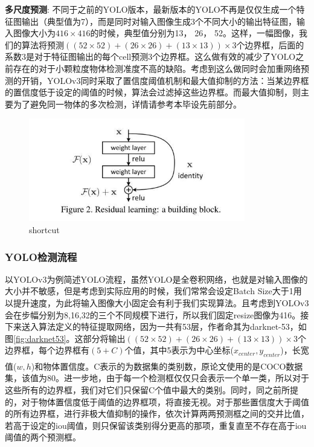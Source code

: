 \documentclass[12pt,a4paper,titlepage]{article}
\newcommand{\upcite}[1]{\textsuperscript{\textsuperscript{\cite{#1}}}}  %
\begin{document}
\textbf{多尺度预测}: 不同于之前的YOLO版本，最新版本的YOLO不再是仅仅生成一个特征图输出（典型值为7），而是同时对输入图像生成3个不同大小的输出特征图，输入图像大小为$416\times 416$的时候，典型值分别为13， 26， 52。这样，一幅图像，我们的算法将预测$((52\times 52)+(26\times 26)+(13\times 13))\times 3$个边界框，后面的系数3是对于特征图输出的每个cell预测3个边界框。这么做有效的减少了YOLO之前存在的对于小颗粒度物体检测准度不高的缺陷。考虑到这么做同时会加重网络预测的开销，YOLOv3同时采取了置信度阈值机制和最大值抑制的方法：当某边界框的置信度低于设定的阈值的时候，算法会过滤掉这些边界框。而最大值抑制，则主要为了避免同一物体的多次检测，详情请参考本毕设先前部分。

\begin{figure}[h]
\centering
\includegraphics[height=4.5cm]{img/shortcut.jpg}
\caption{shortcut}
\label{fig:shortcut}
\end{figure}

\subsubsection{YOLO检测流程}
以YOLOv3为例简述YOLO流程，虽然YOLO是全卷积网络，也就是对输入图像的大小并不敏感，但是考虑到实际应用的时候，我们常常会设定Batch Size大于1用以提升速度，为此将输入图像大小固定会有利于我们实现算法。且考虑到YOLOv3会在步幅分别为8,16,32的三个不同规模下进行，所以我们固定resize图像为416。接下来送入算法定义的特征提取网络，因为一共有53层，作者命其为darknet-53，如图\ref{fig:darknet53}。这部分将输出$((52\times 52)+(26\times 26)+(13\times 13))\times 3$个边界框，每个边界框有$(5+C)$个值，其中5表示为中心坐标($x_{center}, y_{center}$)，长宽值($w, h$)和物体置信度。C表示的为数据集的类别数，原论文使用的是COCO\upcite{}数据集，该值为80。进一步地，由于每一个检测框仅仅只会表示一个单一类，所以对于这些所有的边界框，我们对它们只保留C个值中最大的类别。同时，同之前所提的，对于物体置信度低于阈值的边界框项，将直接无视。对于那些置信度大于阈值的所有边界框，进行非极大值抑制的操作，依次计算两两预测框之间的交并比值，若高于设定的iou阈值，则只保留该类别得分更高的那项，重复直至不存在高于iou阈值的两个预测框。
\end{document}
